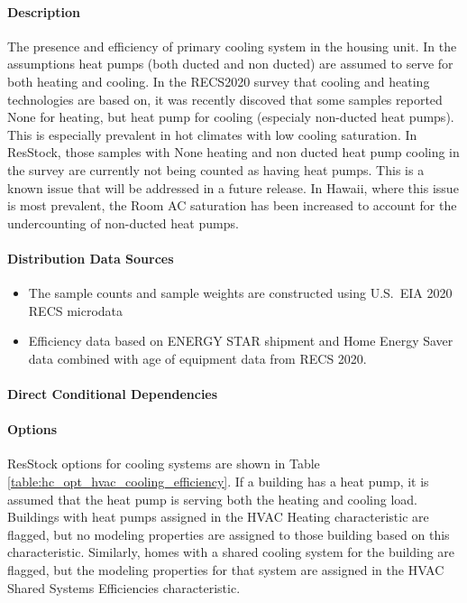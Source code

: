 \paragraph{Description}
% 
The presence and efficiency of primary cooling system in the housing unit. In the assumptions heat pumps (both ducted and non ducted) are assumed to 
serve for both heating and cooling. In the RECS2020 survey that cooling and heating technologies are based on, it was recently discoved that some samples reported None for heating, but heat pump for cooling
(especialy non-ducted heat pumps). This is especially prevalent in hot climates with low cooling saturation. In ResStock, those samples with None heating and non ducted heat pump cooling in the survey
are currently not being counted as having heat pumps. This is a known issue that will be addressed in a future release. In Hawaii, where this issue is most prevalent, the Room AC saturation has been increased to account for the 
undercounting of non-ducted heat pumps. 

\paragraph{Distribution Data Sources}
% 
\begin{itemize}
    \item The sample counts and sample weights are constructed using U.S.~EIA 2020 RECS microdata 
    \item Efficiency data based on ENERGY STAR shipment and Home Energy Saver data combined with age of equipment data from RECS 2020.
\end{itemize}

\paragraph{Direct Conditional Dependencies}


\paragraph{Options}
ResStock options for cooling systems are shown in Table \ref{table:hc_opt_hvac_cooling_efficiency}. If a building has a heat pump, it is assumed that the heat pump is serving both the heating and cooling load. Buildings with heat pumps assigned in the HVAC Heating characteristic are flagged, but no modeling properties are assigned to those building based on this characteristic. Similarly, homes with a shared cooling system for the building are flagged, but the modeling properties for that system are assigned in the HVAC Shared Systems Efficiencies characteristic.

